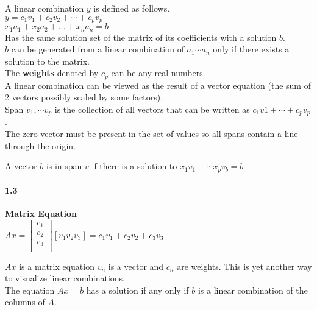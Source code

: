 \documentclass[14pt]{extreport}
\begin{document}
A linear combination $y$ is defined as follows.\\

$y = c_1v_1 + c_2v_2 + \cdots + c_pv_p$\\

$x_1a_1+x_2a_2+...+x_na_n = b$\\

Has the same solution set of the matrix of its coefficients with a solution $b$.\\

$b$ can be generated from a linear combination of $a_1 \cdots a_n$ only if there exists a solution to the matrix.\\

The \textbf{weights} denoted by $c_p$ can be any real numbers.\\

A linear combination can be viewed as the result of a vector equation (the sum of 2 vectors possibly scaled by some factors).\\

Span ${v_1, \cdots v_p}$ is the collection of all vectors that can be written as $c_1v1 + \cdots + c_pv_p$.\\

The zero vector must be present in the set of values so all spans contain a line through the origin.



A vector $b$ is in span $v$ if there is a solution to $x_1v_1 + \cdots x_pv_b = b$\\


\paragraph{1.3}\textbf{Matrix Equation}\\

$Ax = \begin{bmatrix}
	c_1\\
	c_2\\
	c_3\\
\end{bmatrix} 
[v_1 v_2 v_3] = c_1v_1 + c_2v_2 + c_3v_3$

$Ax$ is a matrix equation $v_n$ is a vector and $c_n$ are weights. This is yet another way to visualize linear combinations.\\

The equation $Ax = b$ has a solution if any only if $b$ is a linear combination of the columns of $A$.\\\\
\end{document}
